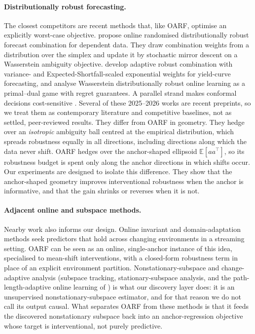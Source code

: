 \documentclass[11pt]{article}
\theoremstyle{plain}
\theoremstyle{remark}
\newcommand{\E}{\mathbb{E}}
\newcommand{\OARF}{\textsc{OARF}}
\begin{document}
\paragraph{Distributionally robust forecasting.} The closest competitors are
recent methods that, like \OARF{}, optimise an explicitly worst-case objective.
\citet{wang2026online} propose online randomised distributionally robust forecast
combination for dependent data. They draw combination weights from a distribution
over the simplex and update it by stochastic mirror descent on a Wasserstein
ambiguity objective. \citet{liu2026fcdro} develop adaptive robust combination with
variance- and Expected-Shortfall-scaled exponential weights for yield-curve
forecasting, and \citet{chen2026wdro} analyse Wasserstein distributionally robust
online learning as a primal--dual game with regret guarantees. A parallel strand
makes conformal decisions cost-sensitive \citep{costaci2026}. Several of these
2025--2026 works are recent preprints, so we treat them as contemporary literature
and competitive baselines, not as settled, peer-reviewed results. They differ from
\OARF{} in geometry. They hedge over an \emph{isotropic} ambiguity ball centred at
the empirical distribution, which spreads robustness equally in all directions,
including directions along which the data never shift. \OARF{} hedges over the
anchor-shaped ellipsoid $\E[aa^\top]$, so its robustness budget is spent only
along the anchor directions in which shifts occur. Our experiments are designed to
isolate this difference. They show that the anchor-shaped geometry improves
interventional robustness when the anchor is informative, and that the gain shrinks
or reverses when it is not.

\paragraph{Adjacent online and subspace methods.} Nearby work also informs our
design. Online invariant and domain-adaptation methods seek predictors that hold
across changing environments in a streaming setting. \OARF{} can be seen as an
online, single-anchor instance of this idea, specialised to mean-shift
interventions, with a closed-form robustness term in place of an explicit
environment partition. Nonstationary-subspace and change-adaptive analysis
(subspace tracking, stationary-subspace analysis, and the path-length-adaptive
online learning of \citealp{zhang2018adaptive}) is what our discovery layer does:
it is an unsupervised nonstationary-subspace estimator, and for that reason we do
not call its output causal. What separates \OARF{} from these methods is that it
feeds the discovered nonstationary subspace back into an anchor-regression
objective whose target is interventional, not purely predictive.
\end{document}
